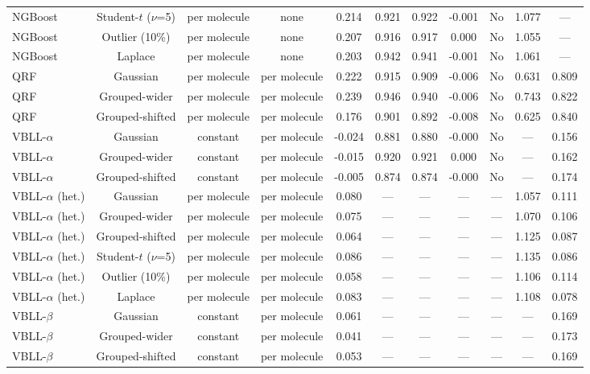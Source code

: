 \begin{table}[!htbp]
\begin{adjustbox}{max width=\textwidth,max totalheight=0.78\textheight}
\begin{tabular}{lcccccccccc}
NGBoost & Student-$t$ ($\nu$=5) & per molecule & none & 0.214 & 0.921 & 0.922 & -0.001 & No & 1.077 & --- \\
NGBoost & Outlier (10\%) & per molecule & none & 0.207 & 0.916 & 0.917 & 0.000 & No & 1.055 & --- \\
NGBoost & Laplace & per molecule & none & 0.203 & 0.942 & 0.941 & -0.001 & No & 1.061 & --- \\
QRF & Gaussian & per molecule & per molecule & 0.222 & 0.915 & 0.909 & -0.006 & No & 0.631 & 0.809 \\
QRF & Grouped-wider & per molecule & per molecule & 0.239 & 0.946 & 0.940 & -0.006 & No & 0.743 & 0.822 \\
QRF & Grouped-shifted & per molecule & per molecule & 0.176 & 0.901 & 0.892 & -0.008 & No & 0.625 & 0.840 \\
VBLL-$\alpha$ & Gaussian & constant & per molecule & -0.024 & 0.881 & 0.880 & -0.000 & No & --- & 0.156 \\
VBLL-$\alpha$ & Grouped-wider & constant & per molecule & -0.015 & 0.920 & 0.921 & 0.000 & No & --- & 0.162 \\
VBLL-$\alpha$ & Grouped-shifted & constant & per molecule & -0.005 & 0.874 & 0.874 & -0.000 & No & --- & 0.174 \\
VBLL-$\alpha$ (het.) & Gaussian & per molecule & per molecule & 0.080 & --- & --- & --- & --- & 1.057 & 0.111 \\
VBLL-$\alpha$ (het.) & Grouped-wider & per molecule & per molecule & 0.075 & --- & --- & --- & --- & 1.070 & 0.106 \\
VBLL-$\alpha$ (het.) & Grouped-shifted & per molecule & per molecule & 0.064 & --- & --- & --- & --- & 1.125 & 0.087 \\
VBLL-$\alpha$ (het.) & Student-$t$ ($\nu$=5) & per molecule & per molecule & 0.086 & --- & --- & --- & --- & 1.135 & 0.086 \\
VBLL-$\alpha$ (het.) & Outlier (10\%) & per molecule & per molecule & 0.058 & --- & --- & --- & --- & 1.106 & 0.114 \\
VBLL-$\alpha$ (het.) & Laplace & per molecule & per molecule & 0.083 & --- & --- & --- & --- & 1.108 & 0.078 \\
VBLL-$\beta$ & Gaussian & constant & per molecule & 0.061 & --- & --- & --- & --- & --- & 0.169 \\
VBLL-$\beta$ & Grouped-wider & constant & per molecule & 0.041 & --- & --- & --- & --- & --- & 0.173 \\
VBLL-$\beta$ & Grouped-shifted & constant & per molecule & 0.053 & --- & --- & --- & --- & --- & 0.169 \\

\end{tabular}
\end{adjustbox}
\end{table}
